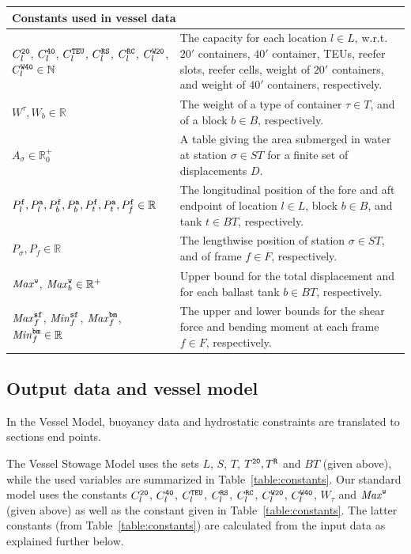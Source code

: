 \vspace{1mm}
\noindent
\begin{tabular}{p{4.5cm}p{8cm}}
\multicolumn{2}{l}{\textbf{Constants used in vessel data}}\\
\hline\noalign{\smallskip}
$C_l^{\texttt{20}}$, $C_l^{\texttt{40}}$, $C_l^{\texttt{TEU}}$, $C_l^{\texttt{RS}}$, $C_l^{\texttt{RC}}$, 
$C_l^{\texttt{W20}}$, $C_l^{\texttt{W40}}\in \mathbb{N}$ & The capacity for each location $l\in L$, w.r.t. $20'$ containers, $40'$ container, TEUs, reefer slots, reefer cells, weight of $20'$ containers, and weight of $40'$ containers, respectively.\\
$W^\tau, W_b\in \mathbb{R}$ & The weight of a type of container $\tau\in T$, and of a block $b\in B$, respectively. \\
$A_{\sigma}\in \mathbb{R}^+_0$ & A table giving the area submerged in water at station $\sigma\in ST$ for a finite set of displacements $D$.\\
$P^{\texttt{f}}_l, P^{\texttt{a}}_l, P^{\texttt{f}}_b, P^{\texttt{a}}_b, P^{\texttt{f}}_t, P^{\texttt{a}}_t, P^{\texttt{f}}_f \in\mathbb{R}$ & The longitudinal position of the fore and aft endpoint of location $l\in L$, block $b \in B$, and tank $t \in BT$, respectively.\\
$P_\sigma, P_f\in \mathbb{R}$& The lengthwise position of station $\sigma\in ST$, and of frame $f\in F$, respectively.\\
$\mathit{Max}^{\texttt{w}}$, $\mathit{Max}^{\texttt{w}}_b\in \mathbb{R}^+$& Upper bound for the total displacement and for each ballast tank $b\in BT$, respectively.\\
$\mathit{Max}^{\texttt{sf}}_f$, $\mathit{Min}^{\texttt{sf}}_f$, $\mathit{Max}^{\texttt{bm}}_f$, $\mathit{Min}^{\texttt{bm}}_f\in\mathbb{R}$ & The upper and lower bounds for the shear force and bending moment at each frame $f\in F$, respectively.\\
\end{tabular}

\subsection*{Output data and vessel model}
In the Vessel Model, buoyancy data and hydrostatic constraints are translated to sections end points. 

The Vessel Stowage Model uses the sets $L$, $S$, $T$, $T^{\texttt{20}}, T^{\texttt{R}}$ and $BT$ (given above), while the used variables are summarized in Table~\ref{table:constants}. Our standard model uses the constants $C_l^{\texttt{20}}$, $C_l^{\texttt{40}}$, $C_l^{\texttt{TEU}}$, $C_l^{\texttt{RS}}$, $C_l^{\texttt{RC}}$, 
$C_l^{\texttt{W20}}$, $C_l^{\texttt{W40}}$, $W_\tau$ and $\mathit{Max}^{\texttt{w}}$ (given above) as well as the constant given in Table~\ref{table:constants}. The latter constants (from Table~\ref{table:constants}) are calculated from the input data as explained further below.

